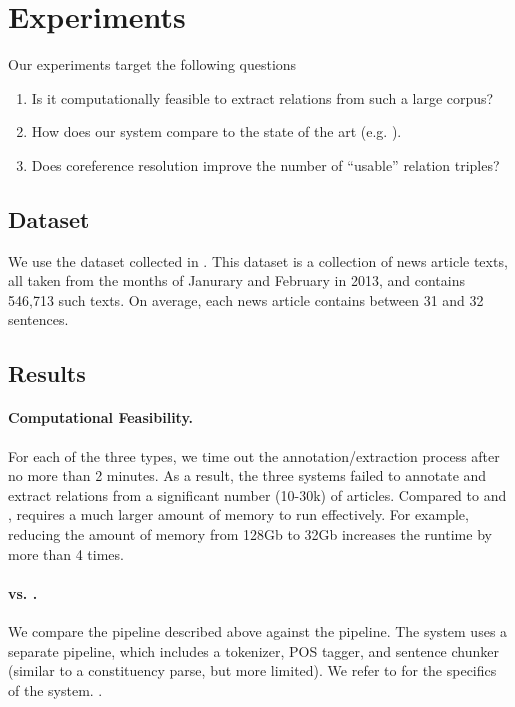 \section{Experiments}

Our experiments target the following questions
\begin{enumerate}
\item Is it computationally feasible to extract relations from 
  such a large corpus?
\item How does our system compare to the state of the art (e.g. \reverb).
\item Does coreference resolution improve the number of 
  ``usable'' relation triples?
\end{enumerate}

\subsection{Dataset}
We use the \newsspike{} dataset collected in \citet{zhang2013parallelparaphrase}.
This dataset is a collection of news article texts, all taken from the months of
Janurary and February in 2013, and contains 546,713 such texts. On average,
each news article contains between 31 and 32 sentences.

\subsection{Results}



 







\paragraph{Computational Feasibility.}
For each of the three types, we time out
the annotation/extraction process after no more than
2 minutes. As a result, the three systems failed to
annotate and extract relations from 
a significant number (10-30k) of articles. Compared to
\reverb{} and \openie{}, \openiecoref{} requires a much 
larger amount of memory to run effectively. For
example, reducing the amount of memory from 128Gb to
32Gb increases the runtime by more than 4 times.

\paragraph{\openie{} vs. \reverb.}
We compare the \openie{} pipeline described above
against the \reverb{} pipeline. The \reverb{} system uses 
a separate pipeline, which includes a tokenizer, POS tagger,
and sentence chunker (similar to a constituency parse, but 
more limited). 
We refer to \citet{fader11reverb} for
the specifics of the \reverb{} system.
.

